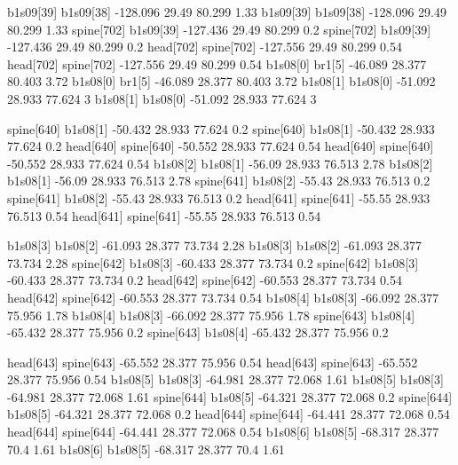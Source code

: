b1s09[39]    b1s09[38]    -128.096    29.49    80.299    1.33
b1s09[39]    b1s09[38]    -128.096    29.49    80.299    1.33
spine[702]    b1s09[39]    -127.436    29.49    80.299    0.2
spine[702]    b1s09[39]    -127.436    29.49    80.299    0.2
head[702]    spine[702]    -127.556    29.49    80.299    0.54
head[702]    spine[702]    -127.556    29.49    80.299    0.54
b1s08[0]    br1[5]    -46.089    28.377    80.403    3.72
b1s08[0]    br1[5]    -46.089    28.377    80.403    3.72
b1s08[1]    b1s08[0]    -51.092    28.933    77.624    3
b1s08[1]    b1s08[0]    -51.092    28.933    77.624    3


spine[640]    b1s08[1]    -50.432    28.933    77.624    0.2
spine[640]    b1s08[1]    -50.432    28.933    77.624    0.2
head[640]    spine[640]    -50.552    28.933    77.624    0.54
head[640]    spine[640]    -50.552    28.933    77.624    0.54
b1s08[2]    b1s08[1]    -56.09    28.933    76.513    2.78
b1s08[2]    b1s08[1]    -56.09    28.933    76.513    2.78
spine[641]    b1s08[2]    -55.43    28.933    76.513    0.2
spine[641]    b1s08[2]    -55.43    28.933    76.513    0.2
head[641]    spine[641]    -55.55    28.933    76.513    0.54
head[641]    spine[641]    -55.55    28.933    76.513    0.54


b1s08[3]    b1s08[2]    -61.093    28.377    73.734    2.28
b1s08[3]    b1s08[2]    -61.093    28.377    73.734    2.28
spine[642]    b1s08[3]    -60.433    28.377    73.734    0.2
spine[642]    b1s08[3]    -60.433    28.377    73.734    0.2
head[642]    spine[642]    -60.553    28.377    73.734    0.54
head[642]    spine[642]    -60.553    28.377    73.734    0.54
b1s08[4]    b1s08[3]    -66.092    28.377    75.956    1.78
b1s08[4]    b1s08[3]    -66.092    28.377    75.956    1.78
spine[643]    b1s08[4]    -65.432    28.377    75.956    0.2
spine[643]    b1s08[4]    -65.432    28.377    75.956    0.2


head[643]    spine[643]    -65.552    28.377    75.956    0.54
head[643]    spine[643]    -65.552    28.377    75.956    0.54
b1s08[5]    b1s08[3]    -64.981    28.377    72.068    1.61
b1s08[5]    b1s08[3]    -64.981    28.377    72.068    1.61
spine[644]    b1s08[5]    -64.321    28.377    72.068    0.2
spine[644]    b1s08[5]    -64.321    28.377    72.068    0.2
head[644]    spine[644]    -64.441    28.377    72.068    0.54
head[644]    spine[644]    -64.441    28.377    72.068    0.54
b1s08[6]    b1s08[5]    -68.317    28.377    70.4    1.61
b1s08[6]    b1s08[5]    -68.317    28.377    70.4    1.61



